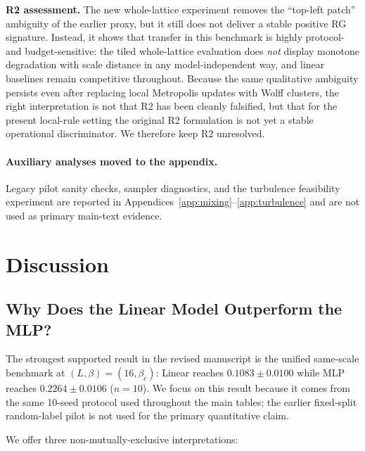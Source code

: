 \documentclass[12pt,a4paper]{memoir}
\begin{document}
\textbf{R2 assessment.}  The new whole-lattice experiment removes the
``top-left patch'' ambiguity of the earlier proxy, but it still does not
deliver a stable positive RG signature.  Instead, it shows that transfer in
this benchmark is highly protocol- and budget-sensitive: the tiled
whole-lattice evaluation does \emph{not} display monotone degradation with
scale distance in any model-independent way, and linear baselines remain
competitive throughout.  Because the same qualitative ambiguity persists even
after replacing local Metropolis updates with Wolff clusters, the right
interpretation is not that R2 has been cleanly falsified, but that for the
present local-rule setting the original R2 formulation is not yet a stable
operational discriminator.  We therefore keep R2 unresolved.

\paragraph{Auxiliary analyses moved to the appendix.}
Legacy pilot sanity checks, sampler diagnostics, and the turbulence
feasibility experiment are reported in
Appendices~\ref{app:mixing}--\ref{app:turbulence} and are not used as primary
main-text evidence.

\section{Discussion}
\label{sec:discussion}

\subsection{Why Does the Linear Model Outperform the MLP?}

The strongest supported result in the revised manuscript is the unified
same-scale benchmark at $(L,\beta)=(16,\beta_c)$:
Linear reaches $0.1083 \pm 0.0100$ while MLP reaches
$0.2264 \pm 0.0106$ ($n=10$).  We focus on this result
because it comes from the same 10-seed protocol used throughout the main
tables; the earlier fixed-split random-label pilot is not used for the
primary quantitative claim.

We offer three non-mutually-exclusive interpretations:
\end{document}
